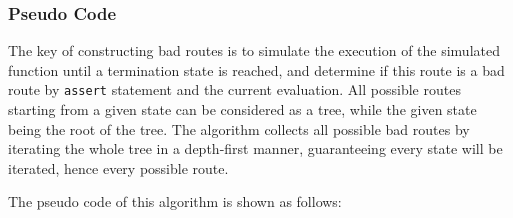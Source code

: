 \documentclass[10pt,journal,final,]{article}
\theoremstyle{definition}
\begin{document}
\subsubsection{Pseudo Code}

The key of constructing bad routes is to simulate the execution of the simulated function until a termination state is reached, and determine if this route is a bad route by \lstinline|assert| statement and the current evaluation.
All possible routes starting from a given state can be considered as a tree, while the given state being the root of the tree. The algorithm collects all possible bad routes by iterating the whole tree in a depth-first manner,
guaranteeing every state will be iterated, hence every possible route.

The pseudo code of this algorithm is shown as follows:
\end{document}
